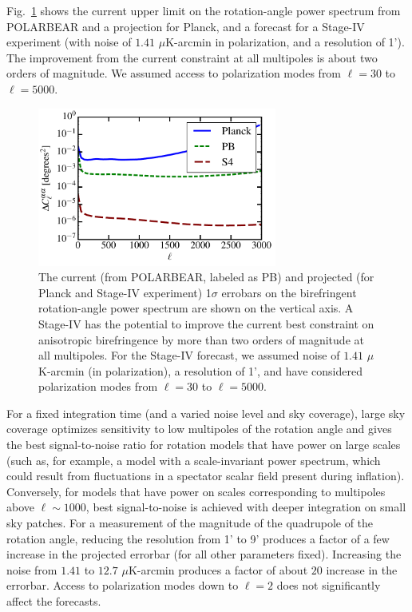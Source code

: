Fig.~\ref{fig:CB-forecast} shows the current upper limit on the rotation-angle power spectrum from POLARBEAR and a projection for Planck, and a forecast for a Stage-IV experiment (with noise of $1.41$ $\mu$K-arcmin in polarization, and a resolution of 1'). The improvement from the current constraint at all multipoles is about two orders of magnitude. We assumed access to polarization modes from $\ell=30$ to $\ell=5000$.
\begin{figure}[h!]
\centering \includegraphics[width=0.70\textwidth]{DarkEnergy/birefringence-S4-planck-PB-v2.pdf}
\caption{The current (from POLARBEAR, labeled as PB) and projected (for Planck and Stage-IV experiment) 1$\sigma$ errobars on the birefringent rotation-angle power spectrum are shown on the vertical axis. A Stage-IV has the potential to improve the current best constraint on anisotropic birefringence by more than two orders of magnitude at all multipoles. For the Stage-IV forecast, we assumed noise of $1.41$ $\mu$K-arcmin (in polarization), a resolution of 1', and have considered polarization modes from $\ell=30$ to $\ell=5000$.}
\label{fig:CB-forecast}
\end{figure}

For a fixed integration time (and a varied noise level and sky coverage), large sky coverage optimizes sensitivity to low multipoles of the rotation angle and gives the best signal-to-noise ratio for rotation models that have power on large scales (such as, for example, a model with a scale-invariant power spectrum, which could result from fluctuations in a spectator scalar field present during inflation). Conversely, for models that have power on scales corresponding to multipoles above $\ell\sim 1000$, best signal-to-noise is achieved with deeper integration on small sky patches.  For a measurement of the magnitude of the quadrupole of the rotation angle, reducing the resolution from 1' to 9' produces a factor of a few increase in the projected errorbar (for all other parameters fixed). Increasing the noise from $1.41$ to $12.7$ $\mu$K-arcmin produces a factor of about $20$ increase in the errorbar. Access to polarization modes down to $\ell=2$ does not significantly affect the forecasts. 


